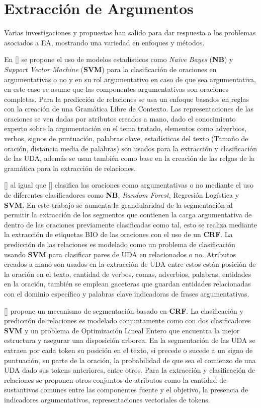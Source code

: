 \section{Extracción de Argumentos}

Varias investigaciones y propuestas han salido para dar respuesta a los problemas asociados a EA, mostrando
una variedad en enfoques y métodos.

En [\cite{palau2009argumentation}] se propone
el uso de modelos estadísticos como \emph{Naive Bayes} (\textbf{NB}) y \emph{Support Vector Machine} (\textbf{SVM}) 
para la clasificación de 
oraciones en argumentativas o no y en su rol argumentativo en caso de que sea argumentativa, en este
caso se asume que las componentes argumentativas son oraciones completas. Para la predicción de relaciones
se usa un enfoque basados en reglas con la creación de una Gramática Libre de Contexto. Las representaciones
de las oraciones se ven dadas por atributos creados a mano, dado el conocimiento experto sobre la argumentación
en el tema tratado, elementos como adverbios, verbos, signos de puntuación, palabras clave, estadísticas del texto
(Tamaño de oración, distancia media de palabras) son usados para la extracción y clasificación de las UDA, además
se usan también como base en la creación de las relgas de la gramática para la extracción de relaciones.

[\cite{goudas2015argument}] al igual que [\cite{palau2009argumentation}] clasifica las oraciones como
argumentativas o no mediante el uso de diferentes clasificadores como \textbf{NB}, \emph{Random Forest}, Regresión
Logística y \textbf{SVM}. En este trabajo se aumenta la grandularidad de la segmentación al permitir
la extracción de los segmentos que contienen la carga argumentativa de dentro de las oraciones previamente clasificadas
como tal, esto se realiza mediante la extracción de etiquetas BIO de las oraciones con el uso de un 
\textbf{CRF}. La predicción de las relaciones es modelado como un problema de clasificación
usando \textbf{SVM} para clasificar pares de UDA en relacionados o no. Atributos creados a mano 
son usados en la extracción de UDA entre estos están posición de la oración en el texto, cantidad de verbos, comas, adverbios,
palabras, entidades en la oración, también se emplean gaceteras que guardan entidades relacionadas con el dominio 
específico y palabras clave indicadoras de frases argumentativas. 

[\cite{stab2017parsing}] propone un mecanismo de segmentación basado en \textbf{CRF}. La clasificación
y predicción de relaciones es modelado conjuntamente como con dos clasificadores \textbf{SVM} y un problema
de Optimización Lineal Entero que encuentra la mejor estructura y asegurar una disposición arborea. En la segmentación
de las UDA se extraen por cada token su posición en el texto, si precede o sucede a un signo de puntuación, su parte de
la oración, la probabilidad de que sea el comienzo de una UDA dado sus tokens anteriores, entre otros. Para la extracción
y clasificación de relaciones se proponen otros conjuntos de atributos como la cantidad de sustantivos comunes entre
las componentes fuente y el objetivo, la presencia de indicadores argumentativos, representaciones vectoriales de tokens.

